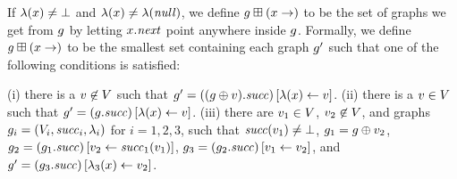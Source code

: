 \begin{graphop}[$\graph\addEdge{\xvar}$]
  If $\lambda(x)\neq\bot$ and
  $\lambda(x)\neq\lambda({\it null})$, we define
  $\graph\addEdge{\xvar}$ to be the set of graphs we
  get from $g$ by letting $x.{\it next}$ point %
  anywhere inside $g$.
  Formally, we define $\graph\addEdge{\xvar}$ to be the smallest set
  containing each graph $g'$ such that one of the following
  conditions is satisfied:
(i) \label{addEdge1}%
    there is a $v\not\in V$ such that
    $g'=\left((g\oplus{\ensuremath{v}}).{\it succ}\right)\left[\lambda(x)\leftarrow v\right]$.
(ii) \label{addEdge2}%
    there is a $v\in V$ such that
    $g'=\left(g.{\it succ}\right)\left[\lambda(x)\leftarrow v\right]$.
(iii) \label{addEdge3}%
    there are $v_1\in V$, $v_2\not\in V$,
    and graphs $g_i=\left(V_i,{\it succ}_i,\lambda_i\right)$
    for $i=1,2,3$, such that ${\it succ}(v_1)\neq\bot$,
    $g_1=g\oplus{\ensuremath{v}}_2$,
    $g_2=\left(g_1.{\it succ}\right)\left[v_2\leftarrow{\it succ}_1(v_1)\right]$,
    $g_3=\left(g_2.{\it succ}\right)\left[v_1\leftarrow v_2\right]$,
    and
    $g'=\left(g_3.{\it succ}\right)\left[\lambda_3(x)\leftarrow v_2\right]$.
\end{graphop}
%


